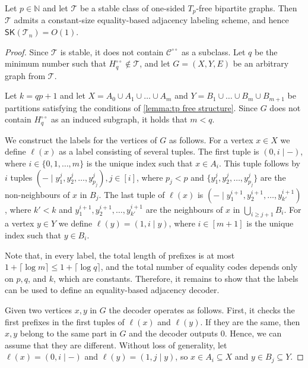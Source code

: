 \documentclass{theoretics}
\newcommand{\ceil}[1]{\ensuremath{\lceil #1 \rceil}}
\newcommand\eqLabelSep{\mathbin|}
\newcommand{\cC}{\ensuremath{\mathcal{C}}}
\newcommand{\cT}{\ensuremath{\mathcal{T}}}
\newcommand{\RL}{\mathsf{SK}}
\newcommand{\dcirc}{{\circ\circ}}
\begin{document}
\begin{lemma}
\label{lemma:tp free labeling}
Let $p \in \mathbb{N}$ and let $\cT$ be a stable class of one-sided $T_{p}$-free bipartite graphs.
Then $\cT$ admits a constant-size equality-based adjacency labeling scheme, and hence 
$\RL(\cT_n) = O(1)$.
%
\end{lemma}
\begin{proof}
	Since $\cT$ is stable, it does not contain $\cC^\dcirc$ as a subclass.
	Let $q$ be the minimum number such that $H^{\circ\circ}_q \not\in \cT$,
	and let $G=(X,Y,E)$ be an arbitrary graph from $\cT$.
	
	Let $k = qp+1$ and let $X =A_0 \cup  A_1 \cup \ldots \cup A_m$ and $Y = B_1 \cup \ldots \cup B_m \cup B_{m+1}$ be partitions satisfying the conditions of \cref{lemma:tp free structure}.
	Since $G$ does not contain $H^{\circ\circ}_q$ as an induced subgraph, it holds that $m < q$.
	
	We construct the labels for the vertices of $G$ as follows. 
	For a vertex $x \in X$ we define $\ell(x)$ as a label consisting of several tuples. The first tuple is
	$(0, i \eqLabelSep -)$, where $i \in \{ 0, 1, \ldots, m \}$ is the unique index such that $x \in A_i$.
	This tuple follows by $i$ tuples $(- \eqLabelSep y^j_1, y^j_2, \ldots, y^j_{p_j}), j \in [i]$, where
	$p_j < p$ and $\{y^j_1, y^j_2, \ldots, y^j_{p_j}\}$ are the non-neighbours of $x$ in $B_j$.
	The last tuple of $\ell(x)$ is $(- \eqLabelSep y^{i+1}_1, y^{i+1}_2, \ldots, y^{i+1}_{k'})$, where $k' < k$
	and $y^{i+1}_1, y^{i+1}_2, \ldots, y^{i+1}_{k'}$ are the neighbours of $x$ in $\bigcup_{i \geq j+1} B_i$.
	For a vertex $y \in Y$ we define $\ell(y) = ( 1, i \eqLabelSep y)$, where $i \in [m+1]$ is the unique index such that $y \in B_i$.
	
	Note that, in every label, the total length of prefixes is at most $1 + \ceil{\log m} \leq 1 + \ceil{\log q}$, and
	the total number of equality codes depends only on $p,q$, and $k$, which are constants.
	Therefore, it remains to show that the labels can be used to define an equality-based adjacency decoder.
		
	Given two vertices $x,y$ in $G$ the decoder operates as follows. 
	First, it checks the first prefixes in the first tuples of $\ell(x)$ and $\ell(y)$.
	If they are the same, then $x,y$ belong to the same part in $G$ and the decoder outputs 0.
	Hence, we can assume that they are different. Without loss of generality, let
	$\ell(x) = (0, i \eqLabelSep -)$ and $\ell(y) = ( 1, j \eqLabelSep y)$, so $x \in A_i \subseteq X$ and $y \in B_j \subseteq Y$.
	

\end{proof}
\end{document}
